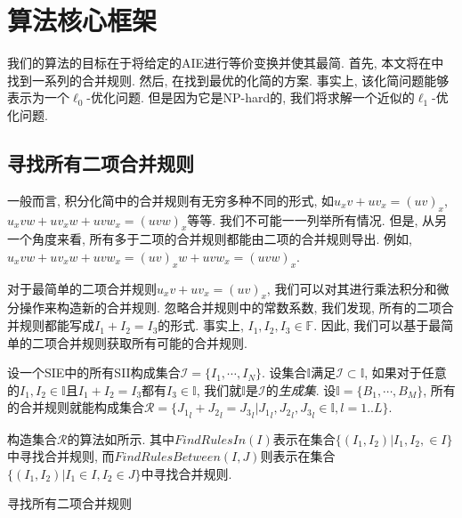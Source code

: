 \section{算法核心框架} \label{Simplify-03}
我们的算法的目标在于将给定的AIE进行等价变换并使其最简. 首先, 本文将在中找到一系列的合并规则. 然后, 在找到最优的化简的方案. 事实上, 该化简问题能够表示为一个$\ell_0$-优化问题. 但是因为它是NP-hard的, 我们将求解一个近似的$\ell_1$-优化问题. 


\subsection{寻找所有二项合并规则}\label{all_rules-03}
一般而言, 积分化简中的合并规则有无穷多种不同的形式, 如$u_x v + u v_x = (uv)_x$, $u_x v w+u v_x w + u v w_x = (uvw)_x$等等. 我们不可能一一列举所有情况. 但是, 从另一个角度来看, 所有多于二项的合并规则都能由二项的合并规则导出. 例如, $u_xvw+uv_xw+uvw_x=(uv)_xw+uvw_x=(uvw)_x$. 

对于最简单的二项合并规则$u_x v + u v_x = (uv)_x$, 我们可以对其进行乘法\zdh 积分和微分操作来构造新的合并规则. 忽略合并规则中的常数系数, 我们发现, 所有的二项合并规则都能写成$I_1+I_2=I_3$的形式. 事实上, $I_1,I_2,I_3\in \mathbb F$. 因此, 我们可以基于最简单的二项合并规则获取所有可能的合并规则. 

设一个SIE中的所有SII构成集合$\mathcal I =\{I_1,\cdots,I_N\}$. 设集合$\mathbb I$满足$\mathcal I \subset \mathbb I$, 如果对于任意的$I_1,I_2\in \mathbb I$且$I_1+I_2=I_3$都有$I_3\in \mathbb I$, 我们就$\mathbb I$是$\mathcal I$的\emph{生成集}. 设$\mathbb I=\{B_1,\cdots,B_M\}$, 所有的合并规则就能构成集合$\mathcal R=\{{J_1}_l+{J_2}_l={J_3}_l|{J_1}_l,{J_2}_l,{J_3}_l \in \mathbb I, l=1..L\}$.

构造集合$\mathcal R$的算法如所示. 其中$FindRulesIn(I)$表示在集合$\{(I_1,I_2)|I_1,I_2,\in I\}$中寻找合并规则, 而$FindRulesBetween(I,J)$则表示在集合$\{(I_1,I_2)|I_1\in I, I_2\in J\}$中寻找合并规则. 

\begin{algorithm}
\caption{寻找所有二项合并规则}
\label{FindAllRules}
\end{algorithm}

